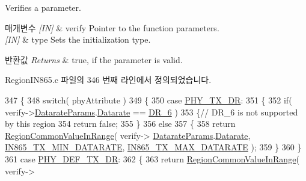 Verifies a parameter. 


\begin{DoxyParams}{매개변수}
{\em \mbox{[}\+I\+N\mbox{]}} & verify Pointer to the function parameters.\\
\hline
{\em \mbox{[}\+I\+N\mbox{]}} & type Sets the initialization type.\\
\hline
\end{DoxyParams}

\begin{DoxyRetVals}{반환값}
{\em Returns} & true, if the parameter is valid. \\
\hline
\end{DoxyRetVals}


Region\+I\+N865.\+c 파일의 346 번째 라인에서 정의되었습니다.


\begin{DoxyCode}
347 \{
348     \textcolor{keywordflow}{switch}( phyAttribute )
349     \{
350         \textcolor{keywordflow}{case} \mbox{\hyperlink{group___r_e_g_i_o_n_gga51cbe8f5433d914fe9cf81b451de2c2da62c19af9dc2c54540562e1158c015f57}{PHY\_TX\_DR}}:
351         \{
352             \textcolor{keywordflow}{if}( verify->\mbox{\hyperlink{unionu_verify_params_a92427be16343eb3d9c14334eb95ec058}{DatarateParams}}.\mbox{\hyperlink{structu_verify_params_1_1s_datarate_params_ae2f6080f3aa0e9485c55513ca56bb24d}{Datarate}} == \mbox{\hyperlink{group___r_e_g_i_o_n_ga8e2b4c15b7dbb8bda5ed635ca1d262be}{DR\_6}} )
353             \{\textcolor{comment}{// DR\_6 is not supported by this region}
354                 \textcolor{keywordflow}{return} \textcolor{keyword}{false};
355             \}
356             \textcolor{keywordflow}{else}
357             \{
358                 \textcolor{keywordflow}{return} \mbox{\hyperlink{group___r_e_g_i_o_n_c_o_m_m_o_n_gafdd1c80d953e18d755a631b72a9c3bd3}{RegionCommonValueInRange}}( verify->
      \mbox{\hyperlink{unionu_verify_params_a92427be16343eb3d9c14334eb95ec058}{DatarateParams}}.\mbox{\hyperlink{structu_verify_params_1_1s_datarate_params_ae2f6080f3aa0e9485c55513ca56bb24d}{Datarate}}, \mbox{\hyperlink{group___r_e_g_i_o_n_i_n865_ga334bf7f8b226ad91762f977490af0c72}{IN865\_TX\_MIN\_DATARATE}}, 
      \mbox{\hyperlink{group___r_e_g_i_o_n_i_n865_ga927945116c9bf6917614b894d45c0972}{IN865\_TX\_MAX\_DATARATE}} );
359             \}
360         \}
361         \textcolor{keywordflow}{case} \mbox{\hyperlink{group___r_e_g_i_o_n_gga51cbe8f5433d914fe9cf81b451de2c2da70c3923333165960549162e3dcf10467}{PHY\_DEF\_TX\_DR}}:
362         \{
363             \textcolor{keywordflow}{return} \mbox{\hyperlink{group___r_e_g_i_o_n_c_o_m_m_o_n_gafdd1c80d953e18d755a631b72a9c3bd3}{RegionCommonValueInRange}}( verify->

\end{DoxyCode}
